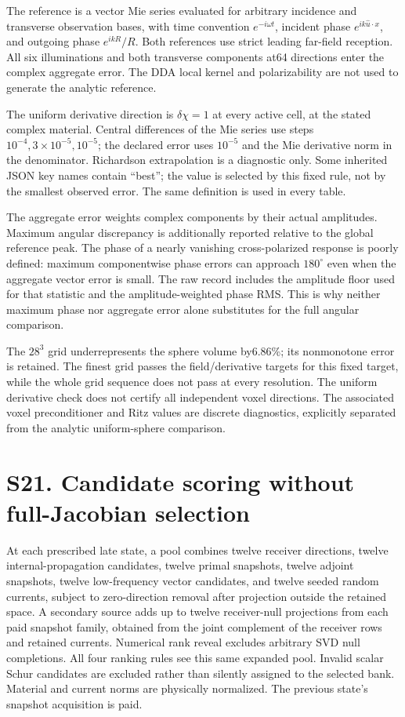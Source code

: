 The reference is a vector Mie series evaluated for arbitrary incidence and transverse observation bases, with time convention $e^{-i\omega t}$, incident phase $e^{ik\widehat u\cdot x}$, and outgoing phase $e^{ikR}/R$. Both references use strict leading far-field reception. All six illuminations and both transverse components at64 directions enter the complex aggregate error. The DDA local kernel and polarizability are not used to generate the analytic reference.

The uniform derivative direction is $\delta\chi=1$ at every active cell, at the stated complex material. Central differences of the Mie series use steps $10^{-4},3\times10^{-5},10^{-5}$; the declared error uses $10^{-5}$ and the Mie derivative norm in the denominator. Richardson extrapolation is a diagnostic only. Some inherited JSON key names contain ``best''; the value is selected by this fixed rule, not by the smallest observed error. The same definition is used in every table.



The aggregate error weights complex components by their actual amplitudes. Maximum angular discrepancy is additionally reported relative to the global reference peak. The phase of a nearly vanishing cross-polarized response is poorly defined: maximum componentwise phase errors can approach $180^\circ$ even when the aggregate vector error is small. The raw record includes the amplitude floor used for that statistic and the amplitude-weighted phase RMS. This is why neither maximum phase nor aggregate error alone substitutes for the full angular comparison.

The $28^3$ grid underrepresents the sphere volume by6.86\%; its nonmonotone error is retained. The finest grid passes the field/derivative targets for this fixed target, while the whole grid sequence does not pass at every resolution. The uniform derivative check does not certify all independent voxel directions. The associated voxel preconditioner and Ritz values are discrete diagnostics, explicitly separated from the analytic uniform-sphere comparison.

\section*{S21. Candidate scoring without full-Jacobian selection}
At each prescribed late state, a pool combines twelve receiver directions, twelve internal-propagation candidates, twelve primal snapshots, twelve adjoint snapshots, twelve low-frequency vector candidates, and twelve seeded random currents, subject to zero-direction removal after projection outside the retained space. A secondary source adds up to twelve receiver-null projections from each paid snapshot family, obtained from the joint complement of the receiver rows and retained currents. Numerical rank reveal excludes arbitrary SVD null completions. All four ranking rules see this same expanded pool. Invalid scalar Schur candidates are excluded rather than silently assigned to the selected bank. Material and current norms are physically normalized. The previous state's snapshot acquisition is paid.

